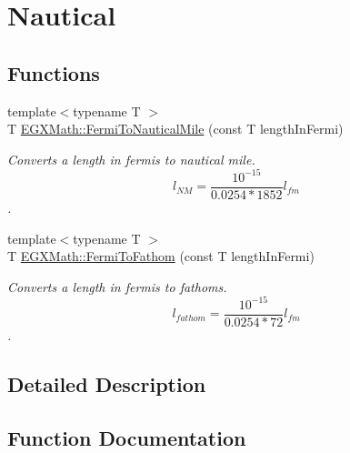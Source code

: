 \hypertarget{group___e_g_x_math-_conversions-_length_conversions-_non-_s_i-_fermi-_nautical}{}\section{Nautical}
\label{group___e_g_x_math-_conversions-_length_conversions-_non-_s_i-_fermi-_nautical}
\subsection*{Functions}
\begin{DoxyCompactItemize}
\item 
{\footnotesize template$<$typename T $>$ }\\T \mbox{\hyperlink{group___e_g_x_math-_conversions-_length_conversions-_non-_s_i-_fermi-_nautical_gac5966592cf227d0a5aa87ead6a4ca7d8}{E\+G\+X\+Math\+::\+Fermi\+To\+Nautical\+Mile}} (const T length\+In\+Fermi)
\begin{DoxyCompactList}\small\item\em Converts a length in fermis to nautical mile. \[ l_{NM}= \frac{10^{-15}}{0.0254 * 1852} l_{fm} \]. \end{DoxyCompactList}\item 
{\footnotesize template$<$typename T $>$ }\\T \mbox{\hyperlink{group___e_g_x_math-_conversions-_length_conversions-_non-_s_i-_fermi-_nautical_ga4c2e2453ec319beb8e5a397ded99967a}{E\+G\+X\+Math\+::\+Fermi\+To\+Fathom}} (const T length\+In\+Fermi)
\begin{DoxyCompactList}\small\item\em Converts a length in fermis to fathoms. \[ l_{fathom}= \frac{10^{-15}}{0.0254 * 72} l_{fm} \]. \end{DoxyCompactList}\end{DoxyCompactItemize}


\subsection{Detailed Description}


\subsection{Function Documentation}
\mbox{\label{group___e_g_x_math-_conversions-_length_conversions-_non-_s_i-_fermi-_nautical_ga4c2e2453ec319beb8e5a397ded99967a}} 

